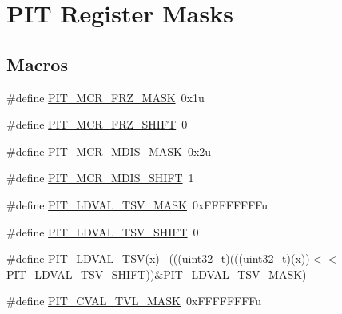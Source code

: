 \hypertarget{group___p_i_t___register___masks}{}\section{P\+IT Register Masks}
\label{group___p_i_t___register___masks}
\subsection*{Macros}
\begin{DoxyCompactItemize}
\item 
\#define \hyperlink{group___p_i_t___register___masks_ga8149a0bb21843632dd4528b540480ba7}{P\+I\+T\+\_\+\+M\+C\+R\+\_\+\+F\+R\+Z\+\_\+\+M\+A\+SK}~0x1u
\item 
\#define \hyperlink{group___p_i_t___register___masks_ga500ccd29eaebc20aa853e7bbb23e3c0c}{P\+I\+T\+\_\+\+M\+C\+R\+\_\+\+F\+R\+Z\+\_\+\+S\+H\+I\+FT}~0
\item 
\#define \hyperlink{group___p_i_t___register___masks_ga024258b2c23ff75f3e161e56adbbe733}{P\+I\+T\+\_\+\+M\+C\+R\+\_\+\+M\+D\+I\+S\+\_\+\+M\+A\+SK}~0x2u
\item 
\#define \hyperlink{group___p_i_t___register___masks_ga7ddcd16550ff71e4ee5ac48022ae6fb6}{P\+I\+T\+\_\+\+M\+C\+R\+\_\+\+M\+D\+I\+S\+\_\+\+S\+H\+I\+FT}~1
\item 
\#define \hyperlink{group___p_i_t___register___masks_gab7929b3b8a0c170a50f57d97face5365}{P\+I\+T\+\_\+\+L\+D\+V\+A\+L\+\_\+\+T\+S\+V\+\_\+\+M\+A\+SK}~0x\+F\+F\+F\+F\+F\+F\+F\+Fu
\item 
\#define \hyperlink{group___p_i_t___register___masks_ga463855d2b42de901bad9bea868f4f48b}{P\+I\+T\+\_\+\+L\+D\+V\+A\+L\+\_\+\+T\+S\+V\+\_\+\+S\+H\+I\+FT}~0
\item 
\#define \hyperlink{group___p_i_t___register___masks_gad83c6bcd6b67260c3f41755dcd2734e0}{P\+I\+T\+\_\+\+L\+D\+V\+A\+L\+\_\+\+T\+SV}(x)                                              ~(((\hyperlink{_p_e___types_8h_a33594304e786b158f3fb30289278f5af}{uint32\+\_\+t})(((\hyperlink{_p_e___types_8h_a33594304e786b158f3fb30289278f5af}{uint32\+\_\+t})(x))$<$$<$\hyperlink{group___p_i_t___register___masks_ga463855d2b42de901bad9bea868f4f48b}{P\+I\+T\+\_\+\+L\+D\+V\+A\+L\+\_\+\+T\+S\+V\+\_\+\+S\+H\+I\+FT}))\&\hyperlink{group___p_i_t___register___masks_gab7929b3b8a0c170a50f57d97face5365}{P\+I\+T\+\_\+\+L\+D\+V\+A\+L\+\_\+\+T\+S\+V\+\_\+\+M\+A\+SK})
\item 
\#define \hyperlink{group___p_i_t___register___masks_ga2810b877338372cb9b9d944b206c08d3}{P\+I\+T\+\_\+\+C\+V\+A\+L\+\_\+\+T\+V\+L\+\_\+\+M\+A\+SK}~0x\+F\+F\+F\+F\+F\+F\+F\+Fu
$$
\end{DoxyCompactItemize}
